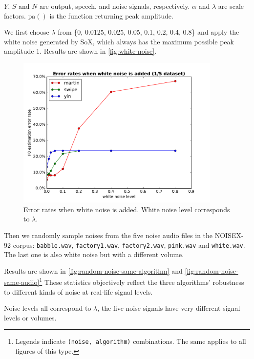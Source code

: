 \documentclass[11pt,a4paper]{report}
\begin{document}
\(Y\), \(S\) and \(N\) are output, speech, and noise signals, respectively.
\(\alpha\) and \(\lambda\) are scale factors.
\(\mathrm{pa}()\) is the function returning peak amplitude.

We first choose \(\lambda\) from \{0, 0.0125, 0.025, 0.05, 0.1, 0.2, 0.4, 0.8\} and apply the white noise generated by SoX, which always has the maximum possible peak amplitude 1.
Results are shown in \autoref{fig:white-noise}.

\begin{figure}[htbp]
  \centering
  \includegraphics[width=0.9\textwidth]{error_rates_white_noise_added.pdf}
  \caption[Error rates when white noise is added.]{Error rates when white noise is added.
    White noise level corresponds to \(\lambda\).}
  \label{fig:white-noise}
\end{figure}

Then we randomly sample noises from the five noise audio files in the NOISEX-92 corpus: \texttt{babble.wav}, \texttt{factory1.wav}, \texttt{factory2.wav}, \texttt{pink.wav} and \texttt{white.wav}.
The last one is also white noise but with a different volume.

Results are shown in \autoref{fig:random-noise-same-algorithm} and \autoref{fig:random-noise-same-audio}\footnote{Legends indicate \texttt{(noise, algorithm)} combinations.
The same applies to all figures of this type.} These statistics objectively reflect the three algorithms' robustness to different kinds of noise at real-life signal levels.

Noise levels all correspond to \(\lambda\), the five noise signals have very different signal levels or volumes.
\end{document}
